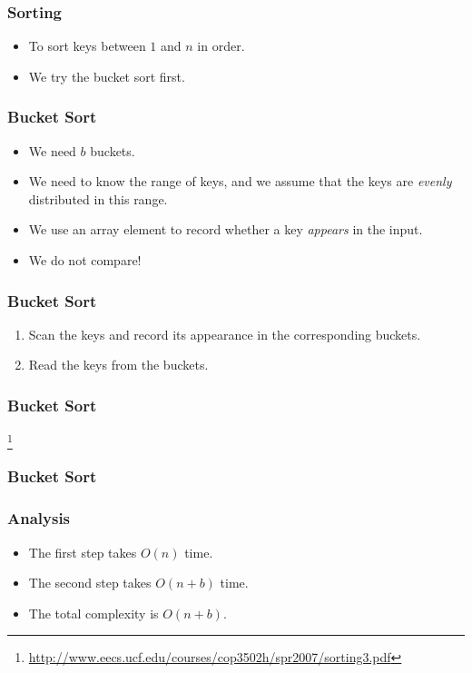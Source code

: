 \documentclass{beamer}
\begin{document}
\begin{CJK}{UTF8}{bsmi}
\begin{frame}
\frametitle{Sorting}
\begin{itemize}
\item To sort keys between $1$ and $n$ in order.
\item We try the bucket sort first.
\end{itemize}
\end{frame}

\begin{frame}
\frametitle{Bucket Sort}
\begin{itemize}
\item We need $b$ buckets.
\item We need to know the range of keys, and we assume that the
  keys are {\em evenly} distributed in this range.
\item We use an array element to record whether a key {\em appears}
  in the input.
\item We do not compare!
\end{itemize}
\end{frame}

\begin{frame}
\frametitle{Bucket Sort}
\begin{enumerate}
\item Scan the keys and record its appearance in the corresponding
  buckets.
\item Read the keys from the buckets.
\end{enumerate}
\end{frame}

\begin{frame}
\frametitle{Bucket Sort}
\footnote{\url{http://www.eecs.ucf.edu/courses/cop3502h/spr2007/sorting3.pdf}}
\end{frame}

\begin{frame}
\frametitle{Bucket Sort}
\centerline{}
\end{frame}

\begin{frame}
\frametitle{Analysis}
\begin{itemize}
\item The first step takes $O(n)$ time.
\item The second step takes $O(n + b)$ time.
\item The total complexity is $O(n + b)$.
\end{itemize}
\end{frame}


\end{CJK}
\end{document}
